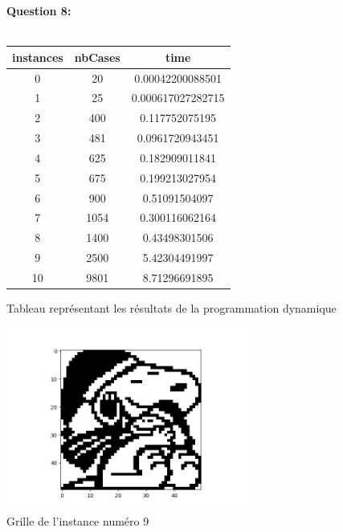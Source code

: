 \documentclass[a4paper]{memoir}
\begin{document}
        
        \begin{figure}
        \textbf{Question 8:}\\\\
        	\begin{minipage}[c]{.5\linewidth}
            \begin{tabular}{|c||c||c|}
              \hline
              instances & nbCases & time \\ 
              \hline
              0 & 20 & 0.00042200088501 \\ 
              \hline
              1 & 25 & 0.000617027282715 \\ 
              \hline
              2 & 400 & 0.117752075195 \\ 
              \hline
              3 & 481 & 0.0961720943451 \\ 
              \hline
              4 & 625 & 0.182909011841 \\ 
              \hline
              5 & 675 & 0.199213027954 \\ 
              \hline
              6 & 900 & 0.51091504097 \\ 
              \hline
              7 & 1054 & 0.300116062164 \\ 
              \hline
              8 & 1400 & 0.43498301506 \\ 
              \hline
              9 & 2500 & 5.42304491997 \\ 
              \hline
              10 & 9801 & 8.71296691895 \\ 
              \hline
            \end{tabular}
            \caption{Tableau représentant les résultats de la programmation dynamique}
            \end{minipage}\hfill
            \begin{minipage}[c]{.5\linewidth}

           \centering
            	\includegraphics[width=8cm]{../images/dynamique_instance9.png}
  				\caption{Grille de l'instance numéro 9}
  
            \end{minipage}
          \end{figure}
\end{document}
